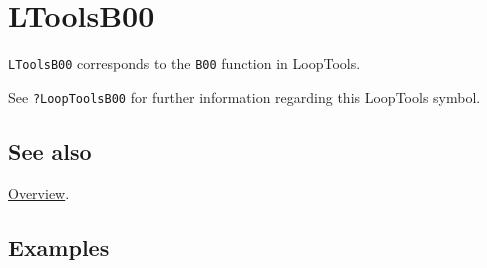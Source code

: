 \documentclass[../FeynHelpersManual.tex]{subfiles}
\begin{document}
\hypertarget{ltoolsb00}{
\section{LToolsB00}\label{ltoolsb00}}

\texttt{LToolsB00} corresponds to the \texttt{B00} function in
LoopTools.

See \texttt{?LoopTools\textasciigrave B00} for further information
regarding this LoopTools symbol.

\subsection{See also}

\hyperlink{toc}{Overview}.

\subsection{Examples}
\end{document}
